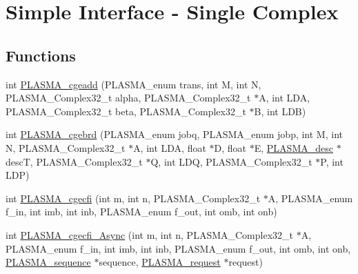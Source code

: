 \hypertarget{group__PLASMA__Complex32__t}{}\section{Simple Interface -\/ Single Complex}
\label{group__PLASMA__Complex32__t}
\subsection*{Functions}
\begin{DoxyCompactItemize}
\item 
int \hyperlink{group__PLASMA__Complex32__t_gabe6af489e627824777d1428f1ab586c0_gabe6af489e627824777d1428f1ab586c0}{P\+L\+A\+S\+M\+A\+\_\+cgeadd} (P\+L\+A\+S\+M\+A\+\_\+enum trans, int M, int N, P\+L\+A\+S\+M\+A\+\_\+\+Complex32\+\_\+t alpha, P\+L\+A\+S\+M\+A\+\_\+\+Complex32\+\_\+t $\ast$A, int L\+D\+A, P\+L\+A\+S\+M\+A\+\_\+\+Complex32\+\_\+t beta, P\+L\+A\+S\+M\+A\+\_\+\+Complex32\+\_\+t $\ast$B, int L\+D\+B)
\item 
int \hyperlink{group__PLASMA__Complex32__t_ga2b35d07a5ac3eb2f953372b16416aeab_ga2b35d07a5ac3eb2f953372b16416aeab}{P\+L\+A\+S\+M\+A\+\_\+cgebrd} (P\+L\+A\+S\+M\+A\+\_\+enum jobq, P\+L\+A\+S\+M\+A\+\_\+enum jobp, int M, int N, P\+L\+A\+S\+M\+A\+\_\+\+Complex32\+\_\+t $\ast$A, int L\+D\+A, float $\ast$D, float $\ast$E, \hyperlink{structplasma__desc__t}{P\+L\+A\+S\+M\+A\+\_\+desc} $\ast$desc\+T, P\+L\+A\+S\+M\+A\+\_\+\+Complex32\+\_\+t $\ast$Q, int L\+D\+Q, P\+L\+A\+S\+M\+A\+\_\+\+Complex32\+\_\+t $\ast$P, int L\+D\+P)
\item 
int \hyperlink{group__PLASMA__Complex32__t_ga4929db84d11a9c38c4f3dc90a0fbedcc_ga4929db84d11a9c38c4f3dc90a0fbedcc}{P\+L\+A\+S\+M\+A\+\_\+cgecfi} (int m, int n, P\+L\+A\+S\+M\+A\+\_\+\+Complex32\+\_\+t $\ast$A, P\+L\+A\+S\+M\+A\+\_\+enum f\+\_\+in, int imb, int inb, P\+L\+A\+S\+M\+A\+\_\+enum f\+\_\+out, int omb, int onb)
\item 
int \hyperlink{group__PLASMA__Complex32__t_ga9a41933eaf78aa1da86f4db54c68ed42_ga9a41933eaf78aa1da86f4db54c68ed42}{P\+L\+A\+S\+M\+A\+\_\+cgecfi\+\_\+\+Async} (int m, int n, P\+L\+A\+S\+M\+A\+\_\+\+Complex32\+\_\+t $\ast$A, P\+L\+A\+S\+M\+A\+\_\+enum f\+\_\+in, int imb, int inb, P\+L\+A\+S\+M\+A\+\_\+enum f\+\_\+out, int omb, int onb, \hyperlink{structplasma__sequence__t}{P\+L\+A\+S\+M\+A\+\_\+sequence} $\ast$sequence, \hyperlink{structplasma__request__t}{P\+L\+A\+S\+M\+A\+\_\+request} $\ast$request)
\item 

\end{DoxyCompactItemize}
